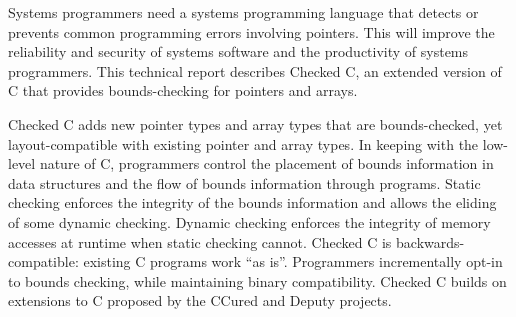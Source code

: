 
\parbox{5in}{
Systems programmers need a systems programming language that
detects or prevents common programming errors involving pointers. This
will improve the reliability and security of systems software and
the productivity of systems programmers. This technical report describes
Checked C, an extended version of C that provides bounds-checking for
pointers and arrays.
}
\vspace{11pt}

\parbox{5in}{
Checked C adds new pointer types and array types that are
bounds-checked, yet layout-compatible with existing pointer and array
types. In keeping with the low-level nature of C, 
programmers control the placement of bounds information in data
structures and the flow of bounds information through programs. Static
checking enforces the integrity of the bounds information and allows the
eliding of some dynamic checking. Dynamic checking enforces the
integrity of memory accesses at runtime when static checking cannot.
Checked C is backwards-compatible: existing C programs work
``as is''. Programmers incrementally opt-in to bounds checking, while
maintaining binary compatibility. Checked C builds on extensions to C
proposed by the CCured and Deputy projects.
}


